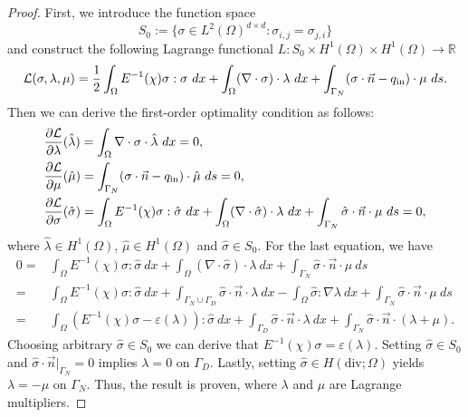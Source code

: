 \documentclass{amsart}
\begin{document}
\begin{proof}
    First, we introduce the function space 
    $$ S_0:= \{\sigma\in L^2(\Omega)^{d\times d}:\sigma_{i,j}=\sigma_{j,i}\}$$ 
    and construct the following Lagrange functional $ L:S_0\times H^1(\Omega)\times H^1(\Omega)\rightarrow \mathbb{R}$
    $$\mathcal{L}(\sigma,\lambda,\mu) = \dfrac{1}{2}\int_{\Omega}E^{-1}(\chi)\sigma:\sigma\ dx+\int_{\Omega}(\nabla\cdot\sigma)\cdot\lambda\ dx+\int_{\Gamma_N}(\sigma\cdot\vec{n}-q_{\rm in})\cdot\mu\ ds.$$
    Then we can derive the first-order optimality condition as follows: 
    \begin{align}
        &\dfrac{\partial \mathcal{L}}{\partial \lambda}(\hat{\lambda})=\int_{\Omega}\nabla\cdot\sigma \cdot\hat{\lambda}\ dx=0,\nonumber\\
        &\dfrac{\partial \mathcal{L}}{\partial \mu}(\hat{\mu})=\int_{\Gamma_N}(\sigma\cdot\vec{n}-q_{\rm in})\cdot\hat{\mu}\ ds=0,\nonumber\\
        &\dfrac{\partial \mathcal{L}}{\partial \sigma}(\hat{\sigma})=\int_{\Omega}E^{-1}(\chi)\sigma:\hat{\sigma}\ dx+\int_{\Omega}(\nabla\cdot\hat{\sigma})\cdot\lambda\ dx+\int_{\Gamma_N}\hat{\sigma}\cdot\vec{n}\cdot\mu\ ds=0,\nonumber
    \end{align}
    where $\hat{\lambda}\in H^1(\Omega)$, $\hat{\mu}\in H^1(\Omega)$ and $\hat{\sigma}\in S_0$. 
    For the last equation, we have
    \begin{align*}
        0=&\int_{\Omega}E^{-1}(\chi)\sigma:\hat{\sigma}\ dx+\int_{\Omega}(\nabla\cdot\hat{\sigma})\cdot\lambda\ dx+\int_{\Gamma_N}\hat{\sigma}\cdot\vec{n}\cdot\mu\ ds\\
        =&\int_{\Omega}E^{-1}(\chi)\sigma:\hat{\sigma}\ dx+\int_{\Gamma_N\cup\Gamma_D}\hat{\sigma}\cdot\vec{n}\cdot\lambda\ dx-\int_{\Omega}\hat{\sigma}:\nabla\lambda\ dx+\int_{\Gamma_N}\hat{\sigma}\cdot\vec{n}\cdot\mu\ ds\\
        =&\int_{\Omega}(E^{-1}(\chi)\sigma-\varepsilon(\lambda)):\hat{\sigma}\ dx+\int_{\Gamma_D}\hat{\sigma}\cdot\vec{n}\cdot\lambda\ dx+\int_{\Gamma_N}\hat{\sigma}\cdot\vec{n}\cdot(\lambda+\mu).
    \end{align*}
Choosing arbitrary $\hat{\sigma}\in S_0$ we can derive that
     $E^{-1}(\chi)\sigma=\varepsilon(\lambda).$
    Setting $\hat{\sigma}\in S_0$ and $\hat{\sigma}\cdot\vec{n}|_{\Gamma_N}=0$ implies
    $\lambda =0$ on $\Gamma_D.$
    Lastly, setting $\hat{\sigma}\in H(\mbox{div};\Omega)$ yields
    $ \lambda = -\mu$ on $\Gamma_N.$
     Thus, the result is proven, where $ \lambda$ and $\mu $ are Lagrange multipliers.
\end{proof}
\end{document}
